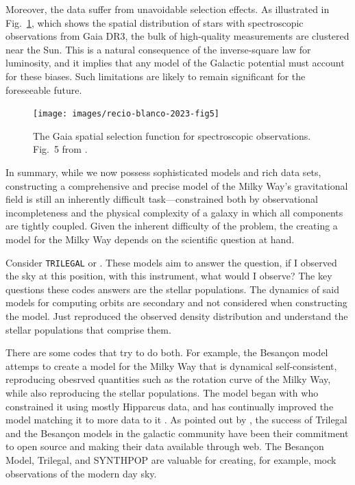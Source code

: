         Moreover, the data suffer from unavoidable selection effects. As illustrated in Fig.~\ref{fig:gaia_selection_function}, which shows the spatial distribution of stars with spectroscopic observations from Gaia DR3, the bulk of high-quality measurements are clustered near the Sun. This is a natural consequence of the inverse-square law for luminosity, and it implies that any model of the Galactic potential must account for these biases. Such limitations are likely to remain significant for the foreseeable future.
        \begin{figure}
            \texttt{[image: images/recio-blanco-2023-fig5]}
            \caption{The Gaia spatial selection function for spectroscopic observations. Fig.~5 from \citet{2023A&A...674A..38G}.}
            \label{fig:gaia_selection_function}
        \end{figure}
        In summary, while we now possess sophisticated models and rich data sets, constructing a comprehensive and precise model of the Milky Way's gravitational field is still an inherently difficult task—constrained both by observational incompleteness and the physical complexity of a galaxy in which all components are tightly coupled. Given the inherent difficulty of the problem, the creating a model for the Milky Way depends on the scientific question at hand. 

        Consider \texttt{TRILEGAL} \citep{2005A&A...436..895G} or  \citep{2025AJ....169..317K}. These models aim to answer the question, if I observed the sky at this position, with this instrument, what would I observe? The key questions these codes answers are the stellar populations. The dynamics of said models for computing orbits are secondary and not considered when constructing the model. Just reproduced the observed density distribution and understand the stellar populations that comprise them.

        There are some codes that try to do both. For example, the Besançon model attemps to create a model for the Milky Way that is dynamical self-consistent, reproducing obesrved quantities such as the rotation curve of the Milky Way, while also reproducing the stellar populations. The model began with \citet{2003A&A...409..523R} who constrained it using mostly Hipparcus data, and has continually improved the model matching it to more data to it \citep{2022A&A...667A..98R}. As pointed out by \citet{2025AJ....169..317K}, the success of Trilegal and the Besançon models in the galactic community have been their commitment to open source and making their data available through web. The Besançon Model, Trilegal, and SYNTHPOP are valuable for creating, for example, mock observations of the modern day sky. 

